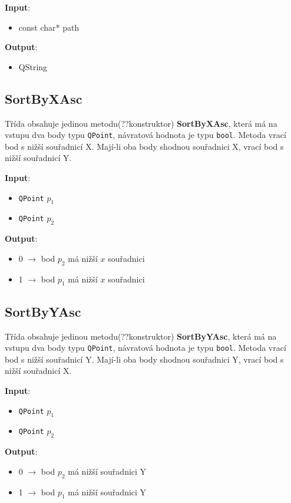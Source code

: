 \documentclass[a4paper, 12pt]{article}
\begin{document}
\textbf{Input}:
\begin{itemize}
\item const char* path
\end{itemize}

\textbf{Output}:
\begin{itemize}
\item QString
\end{itemize}

\subsection{SortByXAsc}
Třída obsahuje jedinou metodu(??konstruktor) \textbf{SortByXAsc}, která má na vstupu dva body typu \texttt{QPoint}, návratová hodnota je typu \texttt{bool}. Metoda vrací bod s nižší  souřadnicí X. Mají-li oba body shodnou souřadnici X, vrací bod s nižší souřadnicí Y.

\textbf{Input}:
\begin{itemize}
\item \texttt{QPoint} $p_1$
\item \texttt{QPoint} $p_2$
\end{itemize}

\textbf{Output}:
\begin{itemize}
\item 0 $\rightarrow$ bod $p_2$ má nižší $x$ souřadnici
\item 1 $\rightarrow$ bod $p_1$ má nižší $x$ souřadnici
\end{itemize}

\subsection{SortByYAsc}
Třída obsahuje jedinou metodu(??konstruktor) \textbf{SortByYAsc}, která má na vstupu dva body typu \texttt{QPoint}, návratová hodnota je typu \texttt{bool}. Metoda vrací bod s nižší  souřadnicí Y. Mají-li oba body shodnou souřadnici Y, vrací bod s nižší souřadnicí X.

\textbf{Input}:
\begin{itemize}
\item \texttt{QPoint} $p_1$
\item \texttt{QPoint} $p_2$
\end{itemize}

\textbf{Output}:
\begin{itemize}
\item 0 $\rightarrow$ bod $p_2$ má nižší souřadnici Y
\item 1 $\rightarrow$ bod $p_1$ má nižší souřadnici Y
\end{itemize}
\end{document}
